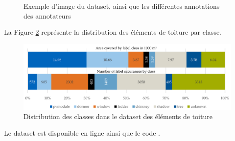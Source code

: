 \begin{figure}[H]
    \caption{Exemple d'image du dataset, ainsi que les différentes annotations des annotateurs \cite{krapf_rid_2021}}
    \label{fig:rid_dataset_image_sample}
\end{figure}

\par{La Figure \ref{fig:rid_dataset_distribution_classes} représente la distribution des éléments de toiture par classe.}
\begin{figure}[H]
    \centering
    \includegraphics[width=1\linewidth]{02-main//figures/ch2/rid_dataset_distribution_classes.png}
    \caption{Distribution des classes dans le dataset des éléments de toiture \cite{krapf_ridroof_2022}}
    \label{fig:rid_dataset_distribution_classes}
\end{figure}
\par{Le dataset est disponible en ligne \cite{krapf_rid_2021} ainsi que le code \cite{krapf_tumftmrid_2025}.}

